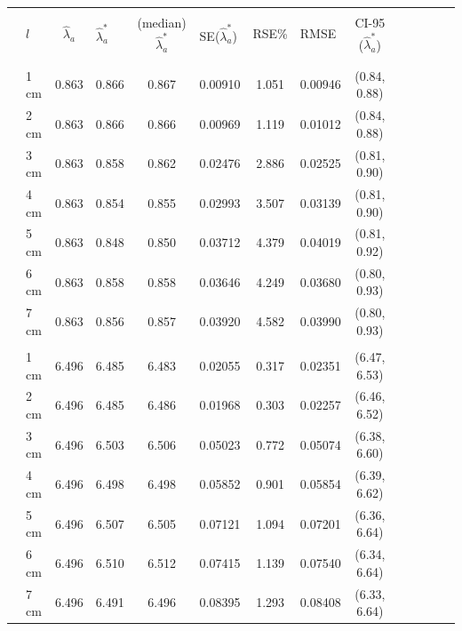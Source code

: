 \documentclass[a4paper 12pt]{article}
\numberwithin{equation}{section}
\begin{document}
\clearpage
 \begin{small}
\begin{table}[h!]
\centering
\setlength\tabcolsep{11.5pt} 
\begin{footnotesize}
\begin{tabular}{clclclclclclcl}
  \hline \\ [0.3ex]
&  $l$ & $\hat{\lambda}_{a}$  & $\hat{\lambda}_{a}^{*}$ & (median) $\hat{\lambda}_{a}^{*}$ & SE($\hat{\lambda}_{a}^{*}$) & RSE\%  & RMSE  &  CI-95 ($\hat{\lambda}_{a}^{*}$) \\ [1.0ex]
\hline \\
 \raisebox{1ex}{\bf age 1}  \\ [1.0ex]
&   1 cm & 0.863 &    0.866  & 0.867 &         0.00910& 1.051 & 0.00946 & (0.84, 0.88)\\
&   2 cm & 0.863 &    0.866  & 0.866 &         0.00969& 1.119 & 0.01012 & (0.84, 0.88)\\
&   3 cm & 0.863 &    0.858  & 0.862 &         0.02476& 2.886 & 0.02525 & (0.81, 0.90) \\
&   4 cm & 0.863 &    0.854  & 0.855 &         0.02993& 3.507 & 0.03139 & (0.81, 0.90) \\
&   5 cm & 0.863 &    0.848  & 0.850 &         0.03712& 4.379 & 0.04019 & (0.81, 0.92)\\
&   6 cm & 0.863 &    0.858  & 0.858 &         0.03646& 4.249 & 0.03680 & (0.80, 0.93)\\
&   7 cm & 0.863 &    0.856  & 0.857 &         0.03920& 4.582 & 0.03990 & (0.80, 0.93)\\[1.5ex]

 \raisebox{1ex}{\bf age 2}  \\ [1.0ex]
&    1 cm & 6.496 &    6.485 & 6.483 &          0.02055& 0.317 & 0.02351 & (6.47, 6.53)\\
&    2 cm & 6.496 &    6.485 & 6.486 &          0.01968& 0.303 & 0.02257 & (6.46, 6.52)\\
&    3 cm & 6.496 &    6.503 & 6.506 &          0.05023& 0.772 & 0.05074 & (6.38, 6.60)\\
&    4 cm & 6.496 &    6.498 & 6.498 &          0.05852& 0.901 & 0.05854 & (6.39, 6.62)\\
&    5 cm & 6.496 &    6.507 & 6.505 &          0.07121& 1.094 & 0.07201 & (6.36, 6.64)\\
&    6 cm & 6.496 &    6.510 & 6.512 &          0.07415& 1.139 & 0.07540 & (6.34, 6.64)\\
&    7 cm & 6.496 &    6.491 & 6.496 &          0.08395& 1.293 & 0.08408 & (6.33, 6.64)\\[1.5ex]


\end{tabular}
\end{footnotesize}
\end{table}
\end{small}
\end{document}
